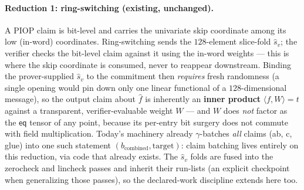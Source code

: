 \documentclass[11pt]{article}
\newcommand{\eq}{\mathsf{eq}}
\theoremstyle{definition}
\begin{document}
\paragraph{Reduction 1: ring-switching (existing, unchanged).} A PIOP
claim is bit-level and carries the univariate skip coordinate among its
low (in-word) coordinates. Ring-switching sends the $128$-element
slice-fold $\hat s_v$; the verifier checks the bit-level claim against it
using the in-word weights --- this is where the skip coordinate is
consumed, never to reappear downstream. Binding the prover-supplied
$\hat s_v$ to the commitment then \emph{requires} fresh randomness (a
single opening would pin down only one linear functional of a
$128$-dimensional message), so the output claim about $\hat f$ is
inherently an \textbf{inner product} $\langle f, W\rangle = t$ against a
transparent, verifier-evaluable weight $W$ --- and $W$ does \emph{not}
factor as the $\eq$ tensor of any point, because its per-entry bit
surgery does not commute with field multiplication. Today's machinery
already $\gamma$-batches \emph{all} claims (ab, c, glue) into one such
statement $(b_{\mathrm{combined}}, \mathrm{target})$: claim batching
lives entirely on this reduction, via code that already exists. The
$\hat s_v$ folds are fused into the zerocheck and lincheck passes and
inherit their run-lists (an explicit checkpoint when generalizing those
passes), so the declared-work discipline extends here too.
\end{document}
